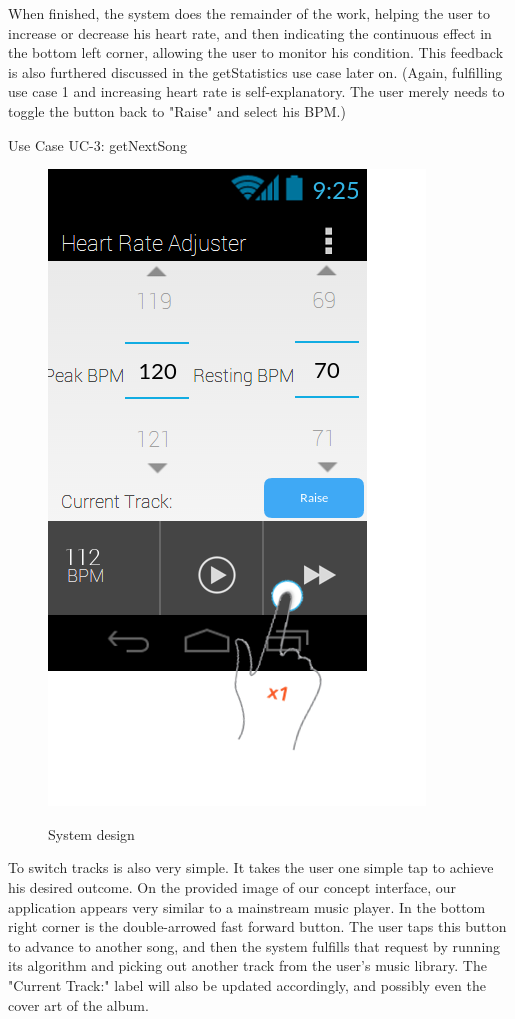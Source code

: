 \documentclass[letterpaper,english, 12pt]{scrreprt}
\begin{document}
When finished, the system does the remainder of the work, helping the user to increase or decrease his heart rate, and then indicating the continuous effect in the bottom left corner, allowing the user to monitor his condition. This feedback is also furthered discussed in the getStatistics use case later on. (Again, fulfilling use case 1 and increasing heart rate is self-explanatory. The user merely needs to toggle the button back to "Raise" and select his BPM.)

Use Case UC-3: getNextSong

\begin{figure}[H]
	\centering
	\includegraphics{img/Prelim_Design/PrelimDesign_2.png}\\
	\caption{System design}
\end{figure}

To switch tracks is also very simple. It takes the user one simple tap to achieve his desired outcome. On the provided image of our concept interface, our application appears very similar to a mainstream music player. In the bottom right corner is the double-arrowed fast forward button. The user taps this button to advance to another song, and then the system fulfills that request by running its algorithm and picking out another track from the user's music library. The "Current Track:" label will also be updated accordingly, and possibly even the cover art of the album.
\end{document}
